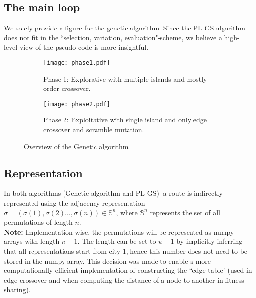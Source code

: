 \documentclass[a4paper,10pt]{article}
\newcommand{\ReplaceMe}[1]{{\color{blue}#1}}
\begin{document}
	


\subsection{The main loop}
	We solely provide a figure for the genetic algorithm. Since the PL-GS algorithm does not fit in the ``selection, variation, evaluation"-scheme, we believe a high-level view of the pseudo-code is more insightful.
	
	\begin{figure}[h]
		\centering
		\begin{subfigure}{0.45\textwidth}
			\texttt{[image: phase1.pdf]}
			\caption{Phase 1: Explorative with multiple islands and mostly order crossover.}
			\label{fig:croppedfile1}
		\end{subfigure} 
		\begin{subfigure}{0.45\textwidth}
			\texttt{[image: phase2.pdf]}
			\caption{Phase 2: Exploitative with single island and only edge crossover and scramble mutation.}
			\label{fig:croppedfile2}
		\end{subfigure}
		\caption{Overview of the Genetic algorithm.}
		\label{fig:comparison}
	\end{figure}

	

\subsection{Representation}\label{sec_rep}
	
	In both algorithms (Genetic algorithm and PL-GS), a route is indirectly represented using the adjacency representation $\sigma = \left( \sigma(1), \sigma(2) \dots, \sigma(n) \right) \in \mathbb{S}^n$, where $\mathbb{S}^n$ represents the set of all permutations of length $n$.\\
	\textbf{Note:} Implementation-wise, the permutations will be represented as numpy arrays with length $n-1$. The length can be set to $n-1$ by implicitly inferring that all representations start from city 1, hence this number does not need to be stored in the numpy array. This decision was made to enable a more computationally efficient implementation of constructing the ``edge-table" (used in edge crossover and when computing the distance of a node to another in fitness sharing). %
	
\end{document}
